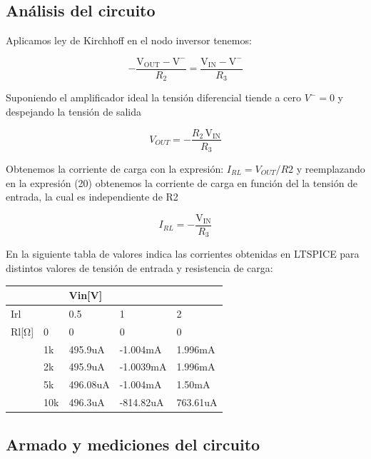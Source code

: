 \documentclass[12pt]{article}
\begin{document}
		\subsection{Análisis del circuito}
		Aplicamos ley de Kirchhoff en el nodo inversor tenemos:
		
		\begin{equation}
			-\frac{\mathrm{V_{OUT}}-\mathrm{V^-}}{R_2 }=\frac{\mathrm{V_{IN}}-\mathrm{V^-}}{R_3 }
		\end{equation}
		
		Suponiendo el amplificador ideal la tensión diferencial tiende a cero ${V^-}=0$ y despejando 
		la tensión de salida
		
		\begin{equation}
			{V_{OUT}}=-\frac{R_2 \,\mathrm{V_{IN}}}{R_3 }
		\end{equation}
		
		Obtenemos la corriente de carga con la expresión: $I_{RL}=V_{OUT}/R2$ y reemplazando en la expresión
		(20) obtenemos la corriente de carga en función del la tensión de entrada, la cual es independiente
		de R2
		
		\begin{equation}
			{I_{RL}}=-\frac{\mathrm{V_{IN}}}{R_3 }
		\end{equation} 
		
		En la siguiente tabla de valores indica las corrientes obtenidas en LTSPICE para distintos
		valores de tensión de entrada y resistencia de carga:
		\begin{table}[!ht]
			\centering
			\begin{tabular}{|l|l|l|l|l|}
				\hline
				~ & ~ & Vin[V] & ~ & ~ \\ \hline
				Irl & ~ & 0.5 & 1 & 2 \\ \hline
				Rl[Ω] & 0 & 0 & 0 & 0 \\ \hline
				~ & 1k & 495.9uA & -1.004mA & 1.996mA \\ \hline
				~ & 2k & 495.9uA & -1.0039mA & 1.996mA \\ \hline
				~ & 5k & 496.08uA & -1.004mA & 1.50mA \\ \hline
				~ & 10k & 496.3uA & -814.82uA & 763.61uA \\ \hline
			\end{tabular}
		\end{table}
		\subsection{Armado y mediciones del circuito}
		\newpage
		
\end{document}
